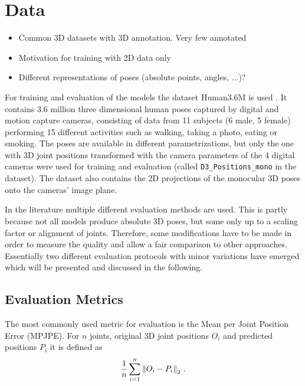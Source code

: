 \section{Data}
\label{sec:data}

\begin{itemize}
	\item Common 3D datasets with 3D annotation. Very few annotated
	\item Motivation for training with 2D data only
	\item Different representations of poses (absolute points, angles, ...)?
\end{itemize}
 

For training and evaluation of the models the dataset Human3.6M is used \cite{ionescu14}. 
It contains 3.6 million three dimensional human poses captured by digital and motion capture cameras, consisting of data from 11 subjects (6 male, 5 female) performing 15 different activities such as walking, taking a photo, eating or smoking.
The poses are available in different parametrizations, but only the one with 3D joint positions transformed with the camera parameters of the 4 digital cameras were used for training and evaluation (called \texttt{D3\_Positions\_mono} in the dataset).
The dataset also contains the 2D projections of the monocular 3D poses onto the cameras' image plane.


In the literature multiple different evaluation methods are used. 
This is partly because not all models produce absolute 3D poses, but some only up to a scaling factor or alignment of joints.
Therefore, some modifications have to be made in order to measure the quality and allow a fair comparison to other approaches.
Essentially two different evaluation protocols with minor variations have emerged which will be presented and discussed in the following.

\subsection{Evaluation Metrics}
The most commonly used metric for evaluation is the Mean per Joint Position Error (MPJPE).
For $n$ joints, original 3D joint positions $O_i$ and predicted positions $P_i$ it is defined as
\begin{equation}
	\frac{1}{n} \sum_{i = 1}^{n}  \norm{O_i - P_i}_2 \ .
\end{equation}


